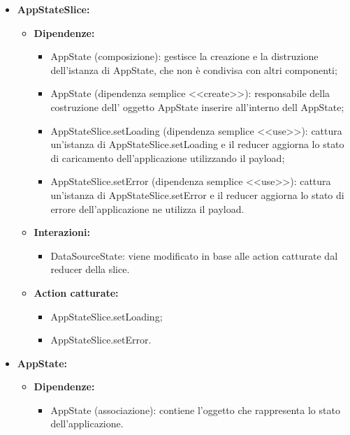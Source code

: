 \begin{itemize}
    \item \textbf{AppStateSlice:}
          \begin{itemize}
              \item \textbf{Dipendenze:}
                    \begin{itemize}
                        \item AppState (composizione): gestisce la creazione e la distruzione dell'istanza di
                              AppState, che non è condivisa con altri componenti;
                        \item AppState (dipendenza semplice <<create>>): responsabile della costruzione dell'
                              oggetto AppState inserire all'interno dell AppState;
                        \item AppStateSlice.setLoading (dipendenza semplice <<use>>): cattura un'istanza di
                              AppStateSlice.setLoading e il reducer aggiorna lo stato di caricamento
                              dell'applicazione utilizzando il payload;
                        \item AppStateSlice.setError (dipendenza semplice <<use>>): cattura un'istanza di
                              AppStateSlice.setError e il reducer aggiorna lo stato di errore
                              dell'applicazione ne utilizza il payload.
                    \end{itemize}
              \item \textbf{Interazioni:}
                    \begin{itemize}
                        \item DataSourceState: viene modificato in base alle action catturate dal reducer
                              della slice.
                    \end{itemize}
              \item \textbf{Action catturate:}
                    \begin{itemize}
                        \item AppStateSlice.setLoading;
                        \item AppStateSlice.setError.
                    \end{itemize}
          \end{itemize}

    \item \textbf{AppState:}
          \begin{itemize}
              \item \textbf{Dipendenze:}
                    \begin{itemize}
                        \item AppState (associazione): contiene l'oggetto che rappresenta lo stato
                              dell'applicazione.
                    \end{itemize}
          \end{itemize}


\end{itemize}
